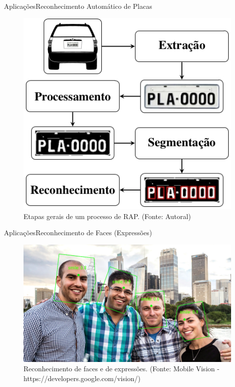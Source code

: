 \begin{frame}{Aplicações}{Reconhecimento Automático de Placas}

\begin{figure}
    \centering
    \includegraphics[scale=.4]{img/lpr.jpeg}
    \caption{Etapas gerais de um processo de RAP. (Fonte: Autoral)}
    \label{fig:lpr_recognition}
\end{figure}

\end{frame}

\begin{frame}{Aplicações}{Reconhecimento de Faces (Expressões)}

\begin{figure}
    \centering
    \includegraphics[scale=.3]{img/face_recognition.png}
    \caption{Reconhecimento de faces e de expressões. (Fonte: Mobile Vision - https://developers.google.com/vision/)}
    \label{fig:face_recognition}
\end{figure}

\end{frame}

